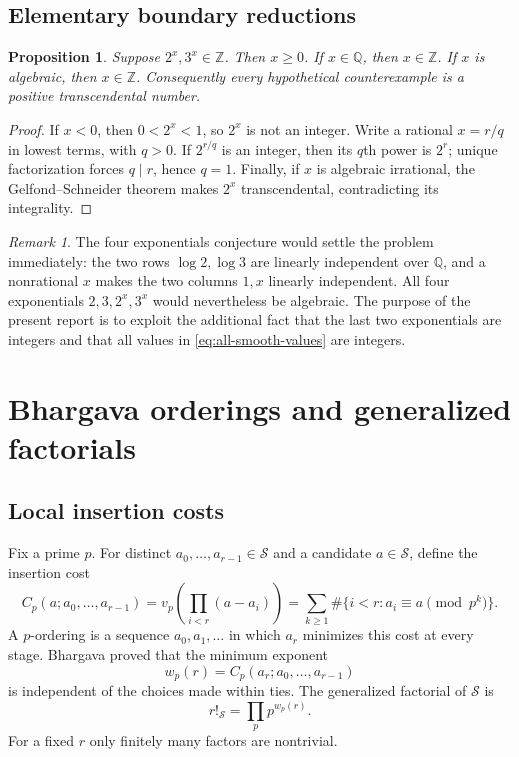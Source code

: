 \documentclass[11pt]{article}
\newtheorem{proposition}[theorem]{Proposition}
\theoremstyle{definition}
\theoremstyle{remark}
\newtheorem{remark}[theorem]{Remark}
\newcommand{\Z}{\mathbb Z}
\newcommand{\Q}{\mathbb Q}
\newcommand{\calS}{\mathcal S}
\begin{document}
\subsection{Elementary boundary reductions}
\begin{proposition}\label{prop:boundary}
Suppose $2^x,3^x\in\Z$.
Then $x\ge0$.  If $x\in\Q$, then $x\in\Z$.  If $x$ is algebraic, then $x\in\Z$.  Consequently every hypothetical counterexample is a positive transcendental number.
\end{proposition}
\begin{proof}
If $x<0$, then $0<2^x<1$, so $2^x$ is not an integer.  Write a rational $x=r/q$ in lowest terms, with $q>0$.  If $2^{r/q}$ is an integer, then its $q$th power is $2^r$; unique factorization forces $q\mid r$, hence $q=1$.  Finally, if $x$ is algebraic irrational, the Gelfond--Schneider theorem makes $2^x$ transcendental, contradicting its integrality.
\end{proof}

\begin{remark}
The four exponentials conjecture would settle the problem immediately: the two rows $\log2,\log3$ are linearly independent over $\Q$, and a nonrational $x$ makes the two columns $1,x$ linearly independent.  All four exponentials $2,3,2^x,3^x$ would nevertheless be algebraic.  The purpose of the present report is to exploit the additional fact that the last two exponentials are integers and that all values in \eqref{eq:all-smooth-values} are integers.
\end{remark}

\section{Bhargava orderings and generalized factorials}

\subsection{Local insertion costs}
Fix a prime $p$.  For distinct $a_0,\dots,a_{r-1}\in\calS$ and a candidate $a\in\calS$, define the insertion cost
\[
       C_p(a;a_0,\dots,a_{r-1})
       =v_p\!\left(\prod_{i<r}(a-a_i)\right)
       =\sum_{k\ge1}\#\{i<r:a_i\equiv a\pmod{p^k}\}.
\]
A $p$-ordering is a sequence $a_0,a_1,\dots$ in which $a_r$ minimizes this cost at every stage.  Bhargava proved that the minimum exponent
\[
       w_p(r)=C_p(a_r;a_0,\dots,a_{r-1})
\]
is independent of the choices made within ties.  The generalized factorial of $\calS$ is
\begin{equation}\label{eq:generalized-factorial}
       r!_{\calS}=\prod_p p^{w_p(r)}.
\end{equation}
For a fixed $r$ only finitely many factors are nontrivial.
\end{document}
